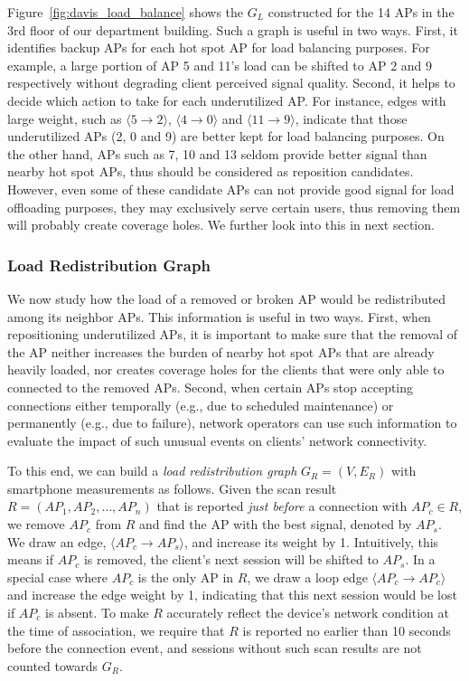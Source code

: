 Figure~\ref{fig:davis_load_balance} shows the $G_L$ constructed for the 14 APs
in the 3rd floor of our department building. Such a graph is useful in two ways. First, it
identifies backup APs for each hot spot AP for load balancing purposes. For
example, a large portion of AP 5 and 11's load can be shifted to AP 2 and 9
respectively without degrading client perceived signal quality. Second, it helps
to decide which action to take for each underutilized AP. For instance, edges
with large weight, such as $\langle 5 \rightarrow 2 \rangle$, $\langle 4
\rightarrow 0 \rangle$ and $\langle 11 \rightarrow 9 \rangle$, indicate that
those underutilized APs (2, 0 and 9) are better kept for load balancing
purposes. On the other hand, APs such as 7, 10 and 13 seldom provide better
signal than nearby hot spot APs, thus should be considered as reposition
candidates. However, even some of these candidate APs can not provide good
signal for load offloading purposes, they may exclusively serve certain users,
thus removing them will probably create coverage holes. We further look into
this in next section.


\subsubsection{Load Redistribution Graph}
\label{subsec:load_redist}

We now study how the load of a removed or broken AP would be
redistributed among its neighbor APs. This information is useful in two ways.
First, when repositioning underutilized APs, it is important to make sure that
the removal of the AP neither increases the burden of nearby hot spot APs
that are already heavily loaded, nor creates coverage holes for the clients that
were only able to connected to the removed APs. Second, when certain APs stop
accepting connections either temporally (e.g., due to scheduled maintenance) or
permanently (e.g., due to failure), network operators can use such information
to evaluate the impact of such unusual events on clients' network connectivity.

To this end, we can build a \textit{load redistribution graph} $G_R=(V, E_R)$ with
smartphone measurements as follows. Given the \wifi{}
scan result $R=(AP_1, AP_2,\ldots, AP_n)$ that is reported \textit{just before}
a \wifi{} connection with $AP_c \in R$, we remove $AP_c$ from $R$ and find the
AP with the best signal, denoted by $AP_s$. We draw an edge, $\langle AP_c
\rightarrow AP_s \rangle$, and increase its weight by 1. Intuitively, this
means if $AP_c$ is removed, the client's next \wifi{} session will be shifted to
$AP_s$. In a special case where $AP_c$ is the only AP in $R$, we draw a loop
edge $\langle AP_c \rightarrow AP_c \rangle$ and increase the edge weight by 1,
indicating that this next session would be lost if $AP_c$ is absent. To make
$R$ accurately reflect the device's network condition at the time of
association, we require that $R$ is reported no earlier than 10 seconds before the
connection event, and \wifi{} sessions without such scan results are not counted
towards $G_R$.

